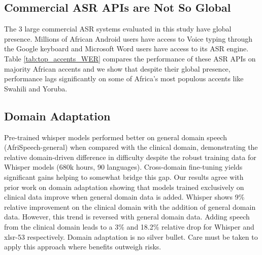 \documentclass[11pt,a4paper]{article}
\begin{document}
\subsection{Commercial ASR APIs are Not So Global} 
The 3 large commercial ASR systems evaluated in this study have global presence. Millions of African Android users have access to Voice typing through the Google keyboard and Microsoft Word users have access to its ASR engine. Table \ref{tab:top_accents_WER} compares the performance of these ASR APIs on majority African accents and we show that despite their global presence, performance lags significantly on some of Africa's most populous accents like Swahili and Yoruba. %


\subsection{Domain Adaptation} 
Pre-trained whisper models performed better on general domain speech (AfriSpeech-general) when compared with the clinical domain, demonstrating the relative domain-driven difference in difficulty despite the robust training data for Whisper models (680k hours, 90 languages). Cross-domain fine-tuning yields significant gains helping to somewhat bridge this gap. Our results agree with prior work on domain adaptation \citep{sun2017unsupervised, abdelwahab2015supervised} showing that models trained exclusively on clinical data improve when general domain data is added. Whisper shows 9\% relative improvement on the clinical domain with the addition of general domain data.  However, this trend is reversed with general domain data. Adding speech from the clinical domain leads to a 3\% and 18.2\% relative drop for Whisper and xlsr-53 respectively. Domain adaptation is no silver bullet. Care must be taken to apply this approach where benefits outweigh risks.


\end{document}
